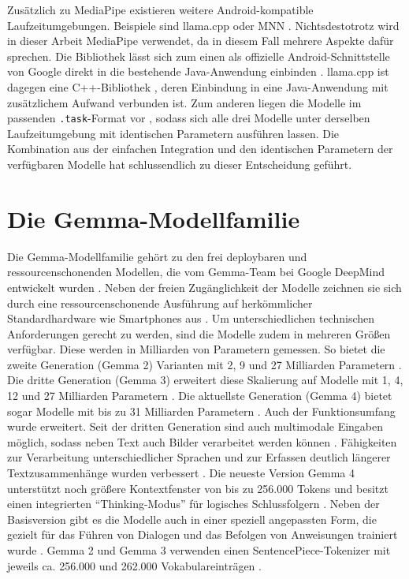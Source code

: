 \noindent Zusätzlich zu MediaPipe existieren weitere Android-kompatible Laufzeitumgebungen. Beispiele sind llama.cpp oder MNN \autocite{guo2025llm}. Nichtsdestotrotz wird in dieser Arbeit MediaPipe verwendet, da in diesem Fall mehrere Aspekte dafür sprechen. Die Bibliothek lässt sich zum einen als offizielle Android-Schnittstelle von Google direkt in die bestehende Java-Anwendung einbinden \autocite{mediapipe_llm}. llama.cpp ist dagegen eine C++-Bibliothek \autocite{guo2025llm}, deren Einbindung in eine Java-Anwendung mit zusätzlichem Aufwand verbunden ist. Zum anderen liegen die Modelle im passenden \texttt{.task}-Format vor \autocite{mediapipe_llm, gemma3_litert, gemma2_litert, qwen_litert}, sodass sich alle drei Modelle unter derselben Laufzeitumgebung mit identischen Parametern ausführen lassen. Die Kombination aus der einfachen Integration und den identischen Parametern der verfügbaren Modelle hat schlussendlich zu dieser Entscheidung geführt.
\section{Die Gemma-Modellfamilie}
\label{sec:gemma}
Die Gemma-Modellfamilie gehört zu den frei deploybaren und ressourcenschonenden Modellen, die vom Gemma-Team bei Google DeepMind entwickelt wurden \autocite{gemma3_2025}.
Neben der freien Zugänglichkeit der Modelle zeichnen sie sich durch eine ressourcenschonende Ausführung auf herkömmlicher Standardhardware wie Smartphones aus \autocite{gemma3_2025,gemma2_2024}. Um unterschiedlichen technischen Anforderungen gerecht zu werden, sind die Modelle zudem in mehreren Größen verfügbar. Diese werden in Milliarden von Parametern gemessen. So bietet die zweite Generation (Gemma 2) Varianten mit 2, 9 und 27 Milliarden Parametern \autocite{gemma2_2024}. Die dritte Generation (Gemma 3) erweitert diese Skalierung auf Modelle mit 1, 4, 12 und 27 Milliarden Parametern \autocite{gemma3_2025}. Die aktuellste Generation (Gemma 4) bietet sogar Modelle mit bis zu 31 Milliarden Parametern \autocite{gemma4_2026}.
Auch der Funktionsumfang wurde erweitert. Seit der dritten Generation sind auch multimodale Eingaben möglich, sodass neben Text auch Bilder verarbeitet werden können \autocite{gemma3_2025}. Fähigkeiten zur Verarbeitung unterschiedlicher Sprachen und zur Erfassen deutlich längerer Textzusammenhänge wurden verbessert \autocite{gemma3_2025}. Die neueste Version Gemma 4 unterstützt noch größere Kontextfenster von bis zu 256.000 Tokens und besitzt einen integrierten \enquote{Thinking-Modus} für logisches Schlussfolgern \autocite{gemma4_2026}. Neben der Basisversion gibt es die Modelle auch in einer speziell angepassten Form, die gezielt für das Führen von Dialogen und das Befolgen von Anweisungen trainiert wurde \autocite{gemma2_2024,gemma3_2025}. Gemma 2 und Gemma 3 verwenden einen SentencePiece-Tokenizer mit jeweils ca. 256.000 und 262.000 Vokabulareinträgen \autocite{gemma2_2024, gemma3_2025}.

